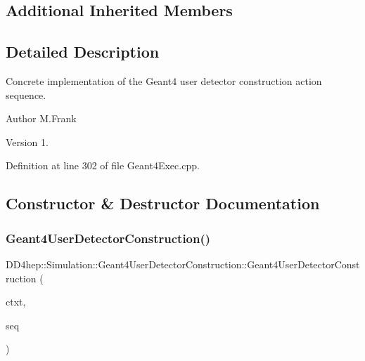 \subsection*{Additional Inherited Members}


\subsection{Detailed Description}
Concrete implementation of the Geant4 user detector construction action sequence. 

\begin{DoxyAuthor}{Author}
M.\+Frank 
\end{DoxyAuthor}
\begin{DoxyVersion}{Version}
1. 
\end{DoxyVersion}


Definition at line 302 of file Geant4\+Exec.\+cpp.



\subsection{Constructor \& Destructor Documentation}
\hypertarget{class_d_d4hep_1_1_simulation_1_1_geant4_user_detector_construction_af1e3e857893be886738096501d5932f7}{}\label{class_d_d4hep_1_1_simulation_1_1_geant4_user_detector_construction_af1e3e857893be886738096501d5932f7} 
\subsubsection{\texorpdfstring{Geant4\+User\+Detector\+Construction()}{Geant4UserDetectorConstruction()}}
{\footnotesize\ttfamily D\+D4hep\+::\+Simulation\+::\+Geant4\+User\+Detector\+Construction\+::\+Geant4\+User\+Detector\+Construction (\begin{DoxyParamCaption}\item[{\hyperlink{class_d_d4hep_1_1_simulation_1_1_geant4_context}{Geant4\+Context} $\ast$}]{ctxt,  }\item[{\hyperlink{class_d_d4hep_1_1_simulation_1_1_geant4_detector_construction_sequence}{Geant4\+Detector\+Construction\+Sequence} $\ast$}]{seq }\end{DoxyParamCaption})\hspace{0.3cm}{\ttfamily [inline]}}



